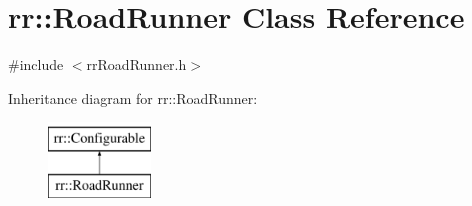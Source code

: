 \hypertarget{classrr_1_1_road_runner}{\section{rr\-:\-:Road\-Runner Class Reference}
\label{classrr_1_1_road_runner}
}


{\ttfamily \#include $<$rr\-Road\-Runner.\-h$>$}

Inheritance diagram for rr\-:\-:Road\-Runner\-:\begin{figure}[H]
\begin{center}
\leavevmode
\includegraphics[height=2.000000cm]{classrr_1_1_road_runner}
\end{center}
\end{figure}
